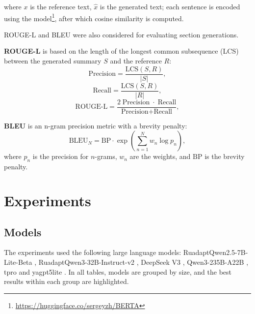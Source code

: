 \documentclass{superfri}
\begin{document}
where $x$ is the reference text, $\hat{x}$ is the generated text; each sentence is encoded using the model\footnote{\url{https://huggingface.co/sergeyzh/BERTA}}, after which cosine similarity is computed.

ROUGE-\allowbreak L and BLEU were also considered for evaluating section generations.

\textbf{ROUGE-L} \cite{rouge} is based on the length of the longest common subsequence (LCS) between the generated summary $S$ and the reference $R$:
\begin{equation}\label{r_p}
  \text{Precision} = \frac{\mathrm{LCS}(S,R)}{|S|},
\end{equation}
\begin{equation}\label{r_r}
  \text{Recall} = \frac{\mathrm{LCS}(S,R)}{|R|},
\end{equation}
\begin{equation}\label{rouge}
  \text{ROUGE‑L} = \frac{2\;\text{Precision}\;\cdot\;\text{Recall}}{\text{Precision} + \text{Recall}},
\end{equation}

\textbf{BLEU} \cite{bleu} is an n-gram precision metric with a brevity penalty:
\begin{equation}\label{bleu}
\mathrm{BLEU}_N = \mathrm{BP}\cdot \exp\!\left(\sum_{n=1}^{N} w_n \log p_n\right),
\end{equation}
where $p_n$ is the precision for $n$-grams, $w_n$ are the weights, and $\mathrm{BP}$ is the brevity penalty.


\section{Experiments}

\subsection{Models}
The experiments used the following large language models:
RuadaptQwen2.5-\allowbreak 7B-\allowbreak Lite-\allowbreak Beta \cite{ruadapt},
RuadaptQwen3-\allowbreak 32B-\allowbreak Instruct-\allowbreak v2 \cite{ruadapt}, 
DeepSeek V3 \cite{deepseek}, 
Qwen3-\allowbreak 235B-\allowbreak A22B \cite{qwen3}, 
tpro \cite{tpro} and yagpt5lite \cite{yagpt}.
In all tables, models are grouped by size, and the best results within each group are highlighted.
\end{document}
